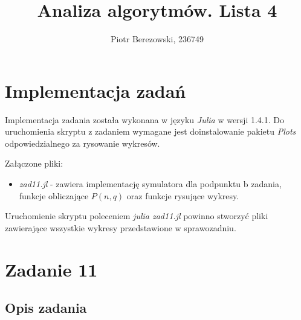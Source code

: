 \documentclass{article}
\title{Analiza algorytmów. Lista 4}
\author{Piotr Berezowski, 236749}
\begin{document}
	\maketitle
	\newpage
    
    \section{Implementacja zadań}
    Implementacja zadania została wykonana w języku \textit{Julia} w wersji 1.4.1. Do uruchomienia skryptu z zadaniem wymagane jest doinstalowanie 
    pakietu \textit{Plots} odpowiedzialnego za rysowanie wykresów. 
    
    Załączone pliki:
        \begin{itemize}
            \item \textit{zad11.jl} - zawiera implementację symulatora dla podpunktu b zadania, funkcje obliczające $P(n,q)$ oraz funkcje rysujące wykresy.
        \end{itemize}

    Uruchomienie skryptu poleceniem \textit{julia zad11.jl} powinno stworzyć pliki zawierające wszystkie wykresy przedstawione w sprawozadniu.
	
	\section{Zadanie 11}
	\subsection{Opis zadania}
\end{document}
